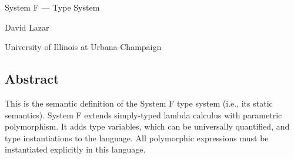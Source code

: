 {\Huge System F --- Type System}
\vspace*{2ex}

{\Large David Lazar}
\vspace*{1ex}

{\large University of Illinois at Urbana-Champaign}

\vspace*{3ex}

\begin{latexComment}
\section*{Abstract}
This is the \K semantic definition of the System F type system (i.e., its static semantics). System F extends simply-typed lambda calculus with parametric polymorphism. It adds type variables, which can be universally quantified, and type instantiations to the language. All polymorphic expressions must be instantiated explicitly in this language.
\end{latexComment}
